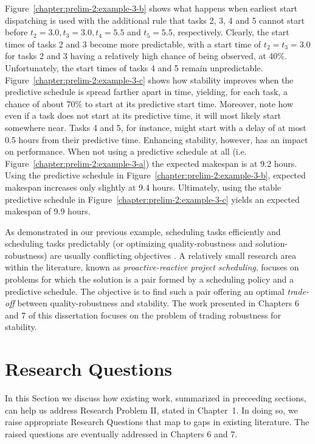 	\begin{example}
		Figure~\ref{chapter:prelim-2:example-3-b}
		shows what happens when earliest start dispatching is used with the additional rule that
		tasks 2, 3, 4 and 5 cannot start before $t_2 = 3.0, t_3 = 3.0, t_4 = 5.5$ and $t_5 = 5.5$, respectively.
		Clearly, the start times of tasks 2 and 3 become more predictable,
		with a start time of $t_2 = t_3 = 3.0$ for tasks 2 and 3 having a relatively high chance of being observed, at 40\%. 
		Unfortunately, the start times of tasks 4 and 5 remain unpredictable.
		Figure~\ref{chapter:prelim-2:example-3-c} shows how stability improves when the predictive schedule is spread farther apart in time,
		yielding, for each task, a chance of about 70\% to start at its predictive start time.
		Moreover, note how even if a task does not start at its predictive time, it will most likely start somewhere near. 
		Tasks 4 and 5, for instance, might start with a delay of at most 0.5 hours from their predictive time.
		Enhancing stability, however, has an impact on performance.
		When not using a predictive schedule at all (i.e. Figure~\ref{chapter:prelim-2:example-3-a}) the expected makespan is at 9.2 hours.
		Using the predictive schedule in Figure~\ref{chapter:prelim-2:example-3-b}, expected makespan increases only slightly at 9.4 hours.
		Ultimately, using the stable predictive schedule in Figure~\ref{chapter:prelim-2:example-3-c} yields an expected makespan of 9.9 hours.
	\end{example}


	As demonstrated in our previous example,
	scheduling tasks efficiently and scheduling tasks predictably 
	(or optimizing quality-robustness and solution-robustness) are usually conflicting objectives \cite{van2006trade}.
	A relatively small research area  within the literature, known as \emph{proactive-reactive project scheduling},
	focuses on problems for which the solution is a pair formed by a scheduling policy and a predictive schedule.
	The objective is to find such a pair offering an optimal \emph{trade-off} between quality-robustness and stability.
	The work presented in Chapters 6 and 7 of this dissertation focuses on the problem of trading robustness for stability.

\section{Research Questions}
\label{chapter:prelim-2:research-questions}
	In this Section we discuss how existing work, summarized in preceeding sections,
	can help us address Research Problem II, stated in Chapter~1.
	In doing so, we raise appropriate Research Questions that map to gaps in existing literature.
	The raised questions are eventually addressed in Chapters 6 and 7.

